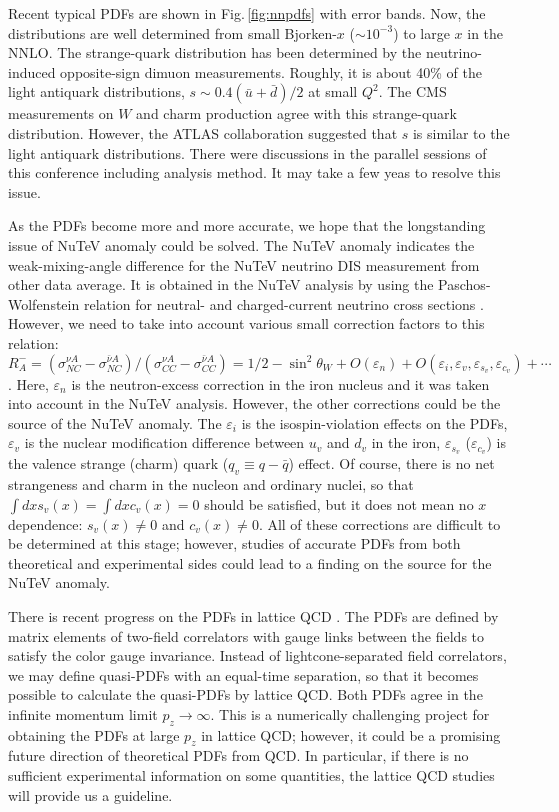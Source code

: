 \documentclass{PoS}
\begin{document}
Recent typical PDFs are shown in Fig.\,\ref{fig:nnpdfs} with error bands.
Now, the distributions are well determined from small Bjorken-$x$ 
($\sim 10^{-3}$) to large $x$ in the NNLO. The strange-quark distribution
has been determined by the neutrino-induced opposite-sign dimuon 
measurements. Roughly, it is about 40\% of the light antiquark
distributions, $s \sim 0.4 (\bar u + \bar d)/2$ at small $Q^2$.
The CMS measurements on $W$ and charm production agree 
with this strange-quark distribution.
However, the ATLAS collaboration suggested that $s$ 
is similar to the light antiquark
distributions. There were discussions
in the parallel sessions of this conference including analysis method.
It may take a few yeas to resolve this issue.

As the PDFs become more and more accurate, we hope that
the longstanding issue of NuTeV anomaly could be solved.
The NuTeV anomaly indicates the weak-mixing-angle difference for
the NuTeV neutrino DIS measurement from other data average.
It is obtained in the NuTeV analysis by using 
the Paschos-Wolfenstein relation for neutral- and 
charged-current neutrino cross sections
\cite{nutev-anomaly}.
However, we need to take into account various small correction
factors to this relation:
$ R_A^- = (\sigma_{NC}^{\nu A} - \sigma_{NC}^{\bar\nu A})
        / (\sigma_{CC}^{\nu A} - \sigma_{CC}^{\bar\nu A}) 
  = 1/2 - \sin^2 \theta_W + O(\varepsilon_n) 
   + O(\varepsilon_i, \varepsilon_v, \varepsilon_{s_v}, \varepsilon_{c_v}) 
   + \cdots$.
Here, $\varepsilon_n$ is the neutron-excess correction in the iron nucleus
and it was taken into account in the NuTeV analysis. However, the other
corrections could be the source of the NuTeV anomaly.
The $\varepsilon_i$ is the isospin-violation effects on the PDFs,
$\varepsilon_v$ is the nuclear modification difference between
$u_v$ and $d_v$ in the iron, 
$\varepsilon_{s_v}$ ($\varepsilon_{c_v}$) is the valence strange (charm) 
quark ($q_v \equiv q - \bar q$) effect.
Of course, there is no net strangeness and charm in the nucleon
and ordinary nuclei, so that $\int dx s_v (x) = \int dx c_v (x)=0$ should
be satisfied, but it does not mean no $x$ dependence: $s_v (x) \ne 0$
and $c_v (x) \ne 0$.
All of these corrections are difficult to be determined at this stage;
however, studies of accurate PDFs from both theoretical and experimental
sides could lead to a finding on the source for the NuTeV anomaly.

There is recent progress on the PDFs in lattice QCD \cite{lattice-PDFs}.
The PDFs are defined by matrix elements of two-field correlators 
with gauge links between the fields to satisfy the color gauge 
invariance. Instead of lightcone-separated field correlators,
we may define quasi-PDFs with an equal-time separation, so that
it becomes possible to calculate the quasi-PDFs by lattice QCD.
Both PDFs agree in the infinite momentum limit $p_z \to \infty$.
This is a numerically challenging project for obtaining the PDFs 
at large $p_z$ in lattice QCD; however, it could be a promising 
future direction of theoretical PDFs from QCD.
In particular, if there is no sufficient experimental
information on some quantities, the lattice QCD studies will 
provide us a guideline.
\end{document}
